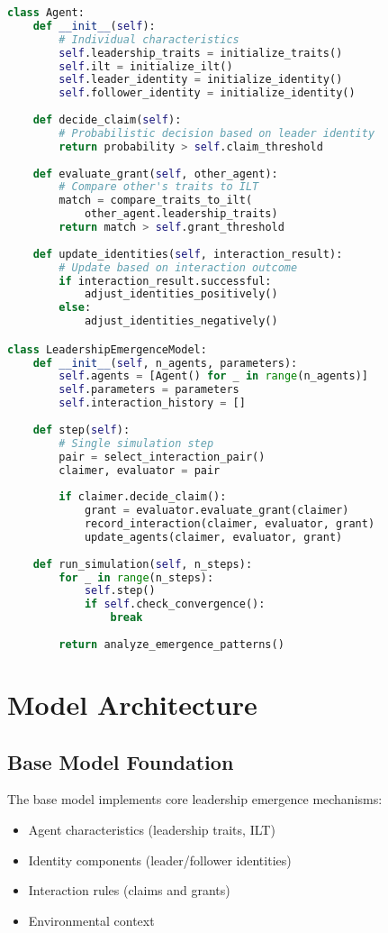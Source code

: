 \documentclass[12pt]{article}
\begin{document}
\begin{lstlisting}[language=Python, caption=Base Model Pseudocode]
class Agent:
    def __init__(self):
        # Individual characteristics
        self.leadership_traits = initialize_traits()
        self.ilt = initialize_ilt()
        self.leader_identity = initialize_identity()
        self.follower_identity = initialize_identity()
        
    def decide_claim(self):
        # Probabilistic decision based on leader identity
        return probability > self.claim_threshold
        
    def evaluate_grant(self, other_agent):
        # Compare other's traits to ILT
        match = compare_traits_to_ilt(
            other_agent.leadership_traits)
        return match > self.grant_threshold
        
    def update_identities(self, interaction_result):
        # Update based on interaction outcome
        if interaction_result.successful:
            adjust_identities_positively()
        else:
            adjust_identities_negatively()

class LeadershipEmergenceModel:
    def __init__(self, n_agents, parameters):
        self.agents = [Agent() for _ in range(n_agents)]
        self.parameters = parameters
        self.interaction_history = []
        
    def step(self):
        # Single simulation step
        pair = select_interaction_pair()
        claimer, evaluator = pair
        
        if claimer.decide_claim():
            grant = evaluator.evaluate_grant(claimer)
            record_interaction(claimer, evaluator, grant)
            update_agents(claimer, evaluator, grant)
            
    def run_simulation(self, n_steps):
        for _ in range(n_steps):
            self.step()
            if self.check_convergence():
                break
                
        return analyze_emergence_patterns()
\end{lstlisting}

\section{Model Architecture}

\subsection{Base Model Foundation}
The base model implements core leadership emergence mechanisms:
\begin{itemize}
    \item Agent characteristics (leadership traits, ILT)
    \item Identity components (leader/follower identities)
    \item Interaction rules (claims and grants)
    \item Environmental context
\end{itemize}
\end{document}
